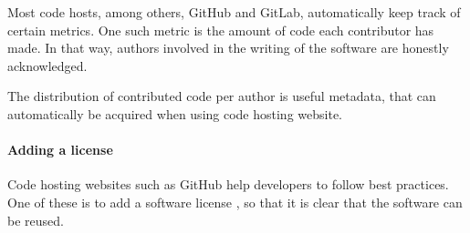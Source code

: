 
Most code hosts, among others, GitHub and GitLab,
automatically keep track of certain metrics.
One such metric is the amount of code each contributor has made.
In that way, authors involved in the writing of the software
are honestly acknowledged. 

The distribution of contributed code per author 
is useful metadata, that can automatically
be acquired when using code hosting website.

\paragraph{Adding a license}

Code hosting websites such as GitHub help developers to follow
best practices. One of these is to add a software license \cite{jimenez2017four},
so that it is clear that the software can be reused.

